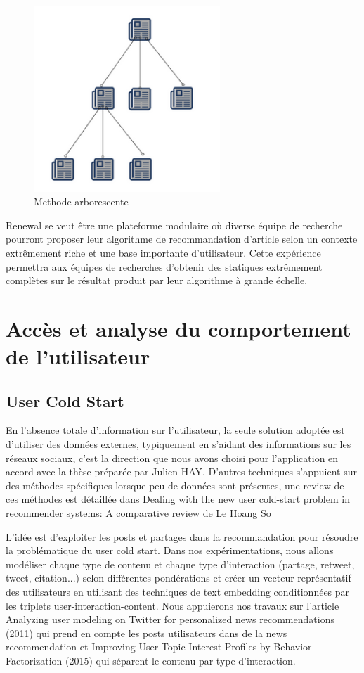\begin{figure}[htp]
  \centering
  \includegraphics[width=7cm]{images/arbo}
  \caption{Methode arborescente}
  \label{fig:arbo}
\end{figure}


Renewal se veut être une plateforme modulaire où diverse équipe de recherche pourront proposer leur algorithme de recommandation d’article selon un contexte extrêmement riche et une base importante d’utilisateur. Cette expérience permettra aux équipes de recherches d’obtenir des statiques extrêmement complètes sur le résultat produit par leur algorithme à grande échelle.  


\section{Accès et analyse du comportement de l'utilisateur}

\subsection{User Cold Start}

En l’absence totale d’information sur l’utilisateur, la seule solution adoptée est d’utiliser des données externes, typiquement en s’aidant des informations sur les réseaux sociaux, c’est la direction que nous avons choisi pour l’application en accord avec la thèse préparée par Julien HAY. D’autres techniques s’appuient sur des méthodes spécifiques lorsque peu de données sont présentes, une review de ces méthodes est détaillée dans Dealing with the new user cold-start problem in recommender systems: A comparative review de Le Hoang So

L’idée est d’exploiter les posts et partages dans la recommandation pour résoudre la problématique du user cold start. Dans nos expérimentations, nous allons modéliser chaque type de contenu et chaque type d’interaction (partage, retweet, tweet, citation...) selon différentes pondérations et créer un vecteur représentatif des utilisateurs en utilisant des techniques de text embedding conditionnées par les triplets user-interaction-content. Nous appuierons nos travaux sur l’article Analyzing user modeling on Twitter for personalized news recommendations (2011) \cite{Analyzing} qui prend en compte les posts utilisateurs dans de la news recommendation et Improving User Topic Interest Profiles by Behavior Factorization (2015) \cite{User} qui séparent le contenu par type d’interaction.



